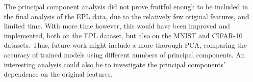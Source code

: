 The principal component analysis did not prove fruitful enough to be included in the final analysis of the EPL data, due to the relatively few original features, and limited time. With more time however, this would have been improved and implemented, both on the EPL dataset, but also on the MNIST and CIFAR-10 datasets. Thus, future work might include a more thorough PCA, comparing the accuracy of trained models using different numbers of principal components. An interesting analysis could also be to investigate the principal components' dependence on the original features. 




